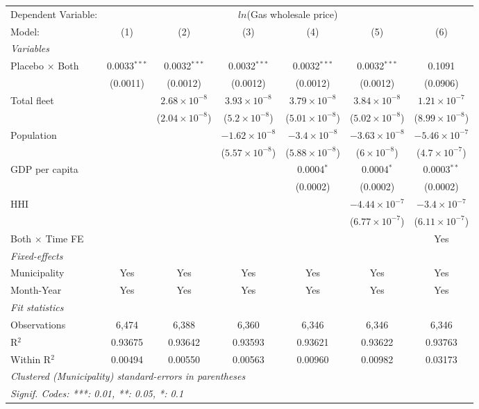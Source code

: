 \documentclass[
]{article}
\begin{document}
\begin{tabular}{lcccccc}
\tabularnewline\midrule\midrule
Dependent Variable:&\multicolumn{6}{c}{$ln$(Gas wholesale price)}\\
Model:&(1) & (2) & (3) & (4) & (5) & (6)\\
\midrule \emph{Variables}&   &   &   &   &   &  \\
Placebo $\times $ Both & 0.0033$^{***}$ & 0.0032$^{***}$ & 0.0032$^{***}$ & 0.0032$^{***}$ & 0.0032$^{***}$ & 0.1091\\
  &(0.0011) & (0.0012) & (0.0012) & (0.0012) & (0.0012) & (0.0906)\\
Total fleet &    & $2.68\times 10^{-8}$ & $3.93\times 10^{-8}$ & $3.79\times 10^{-8}$ & $3.84\times 10^{-8}$ & $1.21\times 10^{-7}$\\
  &   & ($2.04\times 10^{-8}$) & ($5.2\times 10^{-8}$) & ($5.01\times 10^{-8}$) & ($5.02\times 10^{-8}$) & ($8.99\times 10^{-8}$)\\
Population &    &    & $-1.62\times 10^{-8}$ & $-3.4\times 10^{-8}$ & $-3.63\times 10^{-8}$ & $-5.46\times 10^{-7}$\\
  &   &    & ($5.57\times 10^{-8}$) & ($5.88\times 10^{-8}$) & ($6\times 10^{-8}$) & ($4.7\times 10^{-7}$)\\
GDP per capita &    &    &    & 0.0004$^{*}$ & 0.0004$^{*}$ & 0.0003$^{**}$\\
  &   &    &    & (0.0002) & (0.0002) & (0.0002)\\
HHI &    &    &    &    & $-4.44\times 10^{-7}$ & $-3.4\times 10^{-7}$\\
  &   &    &    &    & ($6.77\times 10^{-7}$) & ($6.11\times 10^{-7}$)\\
Both $\times$ Time FE &  &  &  &  &  & Yes\\
\midrule \emph{Fixed-effects}&   &   &   &   &   &  \\
Municipality & Yes & Yes & Yes & Yes & Yes & Yes\\
Month-Year & Yes & Yes & Yes & Yes & Yes & Yes\\
\midrule \emph{Fit statistics}&  & & & & & \\
Observations & 6,474&6,388&6,360&6,346&6,346&6,346\\
R$^2$ & 0.93675&0.93642&0.93593&0.93621&0.93622&0.93763\\
Within R$^2$ & 0.00494&0.00550&0.00563&0.00960&0.00982&0.03173\\
\midrule\midrule\multicolumn{7}{l}{\emph{Clustered (Municipality) standard-errors in parentheses}}\\
\multicolumn{7}{l}{\emph{Signif. Codes: ***: 0.01, **: 0.05, *: 0.1}}\\
\end{tabular}
\end{document}
